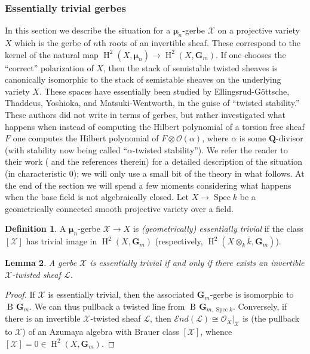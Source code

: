 \documentclass[11pt]{amsart}
\newcommand{\field}[1]{\mathbf #1}
\newcommand{\ms}[1]{\mathscr #1}
\newcommand{\widebar}[1]{\overline{#1}}
\newcommand{\Q}{\field Q}
\newcommand{\send}{\ms E\!nd}
\newcommand{\spec}{\operatorname{Spec}}
\newcommand{\m}{\boldsymbol{\mu}}
\newcommand{\G}{\field G} %
\renewcommand{\H}{\operatorname{H}}
\renewcommand{\[}{[\!\hspace{0.03em}[}
\renewcommand{\]}{]\!\hspace{0.03em}]}
\renewcommand{\(}{(\!\hspace{0.03em}(}
\renewcommand{\)}{)\!\hspace{0.03em})}
\DeclareMathOperator*{\tensor}{\otimes}
\DeclareMathOperator{\B}{\operatorname{B\!}}
\newtheorem{lem}{Lemma}[subsubsection]%
\theoremstyle{definition}
\newtheorem{defn}[lem]{Definition}
\theoremstyle{remark}
\begin{document}
\subsubsection{Essentially trivial gerbes}\label{S:essentially trivial}
In this section we describe the situation for a $\m_{n}$-gerbe $\ms 
X$ on a projective variety $X$ which is the gerbe of $n$th roots of an 
invertible sheaf.  These correspond to the kernel of the natural map 
$\H^{2}(X,\m_{n})\to\H^{2}(X,\G_{m})$.  If one chooses the ``correct'' 
polarization of $X$, then the stack of semistable twisted 
sheaves is canonically isomorphic to the stack of semistable sheaves 
on the underlying variety $X$.  These spaces have essentially been 
studied by Ellingsrud-G\"ottsche, Thaddeus, Yoshioka, and Matsuki-Wentworth, in 
the guise of ``twisted stability.''  These authors did not write in 
terms of gerbes, but rather investigated what happens when instead of 
computing the Hilbert polynomial of a torsion free sheaf $F$ one 
computes the Hilbert polynomial of $F\tensor{\ms O}(\alpha)$, where 
$\alpha$ is some $\Q$-divisor (with stability now being called 
``$\alpha$-twisted stability'').  We refer the reader to their work 
(\cite{yoshioka} and the references therein) 
for a detailed description of the situation (in characteristic 0); we 
will only use a small bit of the theory in what follows.
At the end of the section we will spend a few moments considering what happens when 
the base field is not algebraically closed.  Let $X\to \spec k$ be a 
geometrically connected smooth projective variety over a field.

\begin{defn} A $\m_{n}$-gerbe $\ms X\to X$ is \emph{(geometrically) essentially 
trivial\/} if the class $[\ms X]$ has trivial image in 
$\H^{2}(X,\G_{m})$ (respectively, 
$\H^{2}(X\tensor_{k}\widebar k,\G_{m})$).
\end{defn}

\begin{lem}\label{L:essentially trivial criterion} A gerbe $\ms X$ is 
essentially trivial if and only if there exists an invertible $\ms X$-twisted 
sheaf $\ms L$.
\end{lem}
\begin{proof} If $\ms X$ is essentially trivial, then the associated $\G_m$-gerbe is isomorphic to $\B{\G_m}$.  We can thus pullback a twisted line from $\B{\G_{m,\spec k}}$.  Conversely, if there is an invertible $\ms X$-twisted sheaf $\ms L$, then $\send(\ms L)\cong\ms O_{X}|_{\ms X}$ is (the pullback to $\ms X$) of an Azumaya algebra with Brauer class $[\ms X]$, whence $[\ms X]=0\in\H^2(X,\G_m)$.
\end{proof}
\end{document}
